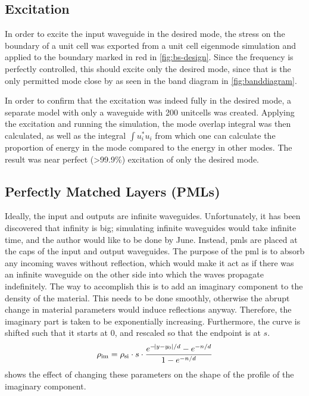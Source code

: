 
\subsection{Excitation}

In order to excite the input waveguide in the desired mode,
the stress on the boundary of a unit cell was exported from a unit cell
eigenmode simulation and applied to the boundary marked in red in
\cref{fig:bs-design}.
Since the frequency is perfectly controlled, this should excite only the desired
mode, since that is the only permitted mode close by as seen in the band diagram
in \cref{fig:banddiagram}.

In order to confirm that the excitation was indeed fully in the desired mode, a
separate model with only a waveguide with 200 unitcells was created.
Applying the excitation and running the simulation, the mode overlap integral
was then calculated, as well as the integral $\int u_i^* u_i$ from which one can
calculate the proportion of energy in the mode compared to the energy in other
modes.
The result was near perfect (>99.9\%) excitation of only the desired mode.

\subsection{Perfectly Matched Layers (PMLs)}

Ideally, the input and outputs are infinite waveguides.
Unfortunately, it has been discovered that infinity is big; simulating
infinite waveguides would take infinite time, and the author would like to be done by
June.
Instead, \glspl{pml} are placed at the caps of the input and output waveguides.
The purpose of the \gls{pml} is to absorb any incoming waves without reflection,
which would make it act as if there was an infinite waveguide on the other side
into which the waves propagate indefinitely.
The way to accomplish this is to add an imaginary component to the density of
the material.
This needs to be done smoothly, otherwise the abrupt change in material
parameters would induce reflections anyway.
Therefore, the imaginary part is taken to be exponentially increasing.
Furthermore, the curve is shifted such that it starts at 0, and rescaled so that
the endpoint is at $s$.
\begin{equation}
	\rho_\text{im} = \rho_\text{si} \cdot s \cdot
	\frac{e^{-\abs{y-y_0} / d} - e^{-n/d}}{1 - e^{-n/d}}
\end{equation}
 shows the effect of changing these parameters on the
shape of the profile of the imaginary component.

